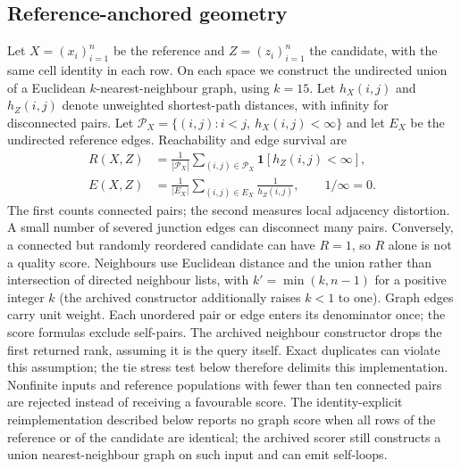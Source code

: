 \documentclass[11pt]{article}
\begin{document}
\subsection{Reference-anchored geometry}

Let $X=(x_i)_{i=1}^n$ be the reference and $Z=(z_i)_{i=1}^n$ the candidate, with the same cell identity in each row. On each space we construct the undirected union of a Euclidean $k$-nearest-neighbour graph, using $k=15$. Let $h_X(i,j)$ and $h_Z(i,j)$ denote unweighted shortest-path distances, with infinity for disconnected pairs. Let $\mathcal P_X=\{(i,j):i<j,\ h_X(i,j)<\infty\}$ and let $E_X$ be the undirected reference edges. Reachability and edge survival are
\begin{align}
 R(X,Z)&=\frac{1}{|\mathcal P_X|}\sum_{(i,j)\in\mathcal P_X}\mathbf 1[h_Z(i,j)<\infty],\label{eq:reachability}\\
 E(X,Z)&=\frac{1}{|E_X|}\sum_{(i,j)\in E_X}\frac{1}{h_Z(i,j)},\qquad 1/\infty=0.
\end{align}
The first counts connected pairs; the second measures local adjacency distortion. A small number of severed junction edges can disconnect many pairs. Conversely, a connected but randomly reordered candidate can have $R=1$, so $R$ alone is not a quality score. Neighbours use Euclidean distance and the union rather than intersection of directed neighbour lists, with $k'=\min(k,n-1)$ for a positive integer $k$ (the archived constructor additionally raises $k<1$ to one). Graph edges carry unit weight. Each unordered pair or edge enters its denominator once; the score formulas exclude self-pairs. The archived neighbour constructor drops the first returned rank, assuming it is the query itself. Exact duplicates can violate this assumption; the tie stress test below therefore delimits this implementation. Nonfinite inputs and reference populations with fewer than ten connected pairs are rejected instead of receiving a favourable score. The identity-explicit reimplementation described below reports no graph score when all rows of the reference or of the candidate are identical; the archived scorer still constructs a union nearest-neighbour graph on such input and can emit self-loops.
\end{document}
